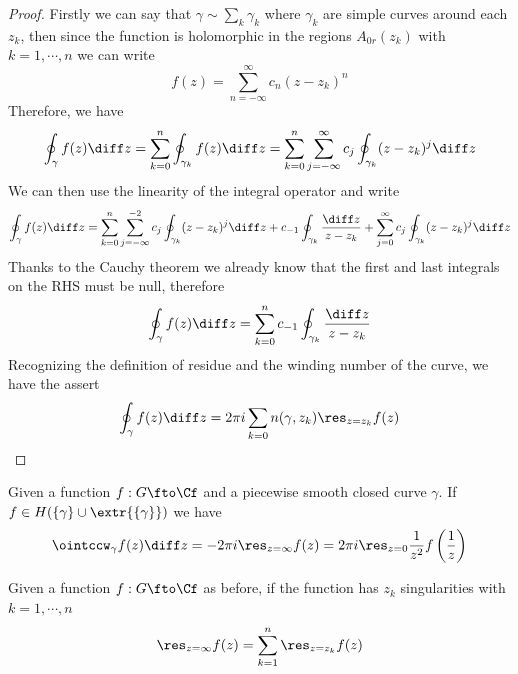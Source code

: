 \documentclass[../mmf.tex]{subfiles}
\begin{document}
\begin{proof}
	Firstly we can say that $\gamma\sim\sum_k\gamma_k$ where $\gamma_k$ are simple curves around each $z_k$, then since the function is holomorphic in the regions $A_{0r}(z_k)$ with $k=1,\cdots,n$ we can write
	\begin{equation*}
		f(z)=\sum_{n=-\infty}^{\infty}c_n(z-z_k)^n
	\end{equation*}
	Therefore, we have
	\begin{equation*}
		\oint_\gamma f(z)\diff z=\sum_{k=0}^{n}\oint_{\gamma_k}f(z)\diff z=\sum_{k=0}^n\sum_{j=-\infty}^\infty c_j\oint_{\gamma_k}(z-z_k)^j\diff z
	\end{equation*}
	We can then use the linearity of the integral operator and write
	\begin{equation*}
		\oint_\gamma f(z)\diff z=\sum_{k=0}^n\sum_{j=-\infty}^{-2}c_{j}\oint_{\gamma_k}(z-z_k)^j\diff z+c_{-1}\oint_{\gamma_k}\frac{\diff z}{z-z_k}+\sum_{j=0}^\infty c_j\oint_{\gamma_k}(z-z_k)^j\diff z
	\end{equation*}
	Thanks to the Cauchy theorem we already know that the first and last integrals on the RHS must be null, therefore
	\begin{equation*}
		\oint_\gamma f(z)\diff z=\sum_{k=0}^nc_{-1}\oint_{\gamma_k}\frac{\diff z}{z-z_k}
	\end{equation*}
	Recognizing the definition of residue and the winding number of the curve, we have the assert
	\begin{equation*}
		\oint_\gamma f(z)\diff z=2\pi i\sum_{k=0}n(\gamma,z_k)\res_{z=z_k}f(z)
	\end{equation*}
\end{proof}
\begin{dfn}
	Given a function $f:G\fto\Cf$ and a piecewise smooth closed curve $\gamma$. If $f\in H(\{\gamma\}\cup\extr{\{\gamma\}})$ we have
	\begin{equation}
		\ointccw_\gamma f(z)\diff z=-2\pi i\res_{z=\infty}f(z)=2\pi i\res_{z=0}\frac{1}{z^2}f\left( \frac{1}{z} \right)
		\label{eq:infresidue}
	\end{equation}
\end{dfn}
\begin{thm}
	Given a function $f:G\fto\Cf$ as before, if the function has $z_k$ singularities with $k=1,\cdots,n$
	\begin{equation}
		\res_{z=\infty}f(z)=\sum_{k=1}^n\res_{z=z_k}f(z)
		\label{eq:residueformula}
	\end{equation}
\end{thm}
\end{document}
